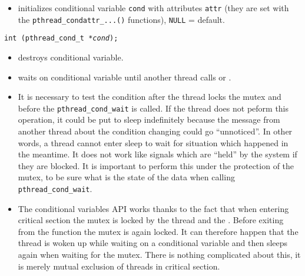


\begin{slide}
\prgchars
{}
\begin{itemize}
\item initializes conditional variable \texttt{cond} with attributes \texttt{attr}
(they are set with the \texttt{pthread\_condattr\_...()} functions),
\texttt{NULL} = default.
\end{itemize}
\texttt{int (pthread\_cond\_t *\emph{cond});}
\begin{itemize}
\item destroys conditional variable.
\end{itemize}
\begin{itemize}
\item waits on conditional variable until another thread calls
 or .
\end{itemize}
\end{slide}

\begin{itemize}
\item It is necessary to test the condition after the thread locks the mutex
and before the \texttt{pthread\_cond\_wait} is called. If the thread does not
peform this operation, it could be put to sleep indefinitely because the 
message from another thread about the condition changing could go ``unnoticed''.
In other words, a thread cannot enter sleep to wait for situation which happened
in the meantime. It does not work like signals which are ``held'' by the system
if they are blocked. It is important to perform this under the protection of
the mutex, to be sure what is the state of the data when calling
\texttt{pthread\_cond\_wait}.
\item The conditional variables API works thanks to the fact that when entering
critical section the mutex is locked by the thread and the
. Before exiting from the function the mutex is again
locked.
It can therefore happen that the thread is woken up while waiting on a
conditional variable and then sleeps again when waiting for the mutex.
There is nothing complicated about this, it is merely mutual exclusion of 
threads in critical section.
\end{itemize}


